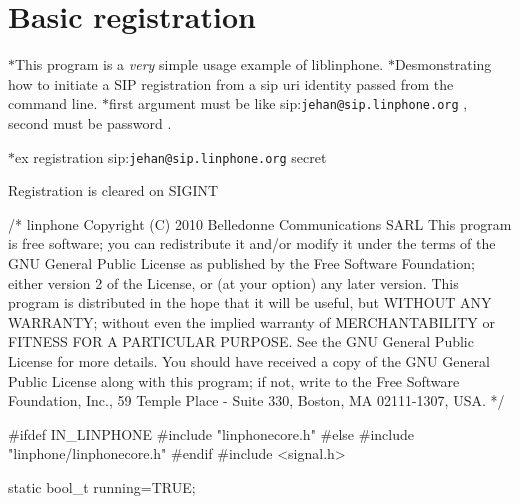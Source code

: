 \section{Basic registration}
\label{group__registration__tutorials}
$\ast$\-This program is a {\itshape very} simple usage example of liblinphone. $\ast$\-Desmonstrating how to initiate a S\-I\-P registration from a sip uri identity passed from the command line. $\ast$first argument must be like sip\-:{\tt jehan@sip.\-linphone.\-org} , second must be password . \par
 $\ast$ex registration sip\-:{\tt jehan@sip.\-linphone.\-org} secret \par
Registration is cleared on S\-I\-G\-I\-N\-T \par
 
\begin{DoxyCodeInclude}

\textcolor{comment}{/*}
\textcolor{comment}{linphone}
\textcolor{comment}{Copyright (C) 2010  Belledonne Communications SARL }
\textcolor{comment}{}
\textcolor{comment}{This program is free software; you can redistribute it and/or}
\textcolor{comment}{modify it under the terms of the GNU General Public License}
\textcolor{comment}{as published by the Free Software Foundation; either version 2}
\textcolor{comment}{of the License, or (at your option) any later version.}
\textcolor{comment}{}
\textcolor{comment}{This program is distributed in the hope that it will be useful,}
\textcolor{comment}{but WITHOUT ANY WARRANTY; without even the implied warranty of}
\textcolor{comment}{MERCHANTABILITY or FITNESS FOR A PARTICULAR PURPOSE.  See the}
\textcolor{comment}{GNU General Public License for more details.}
\textcolor{comment}{}
\textcolor{comment}{You should have received a copy of the GNU General Public License}
\textcolor{comment}{along with this program; if not, write to the Free Software}
\textcolor{comment}{Foundation, Inc., 59 Temple Place - Suite 330, Boston, MA  02111-1307, USA.}
\textcolor{comment}{*/}

\textcolor{preprocessor}{#ifdef IN\_LINPHONE}
\textcolor{preprocessor}{}\textcolor{preprocessor}{#include "linphonecore.h"}
\textcolor{preprocessor}{#else}
\textcolor{preprocessor}{}\textcolor{preprocessor}{#include "linphone/linphonecore.h"}
\textcolor{preprocessor}{#endif}
\textcolor{preprocessor}{}
\textcolor{preprocessor}{#include <signal.h>}

\textcolor{keyword}{static} bool\_t running=TRUE;


\end{DoxyCodeInclude}
